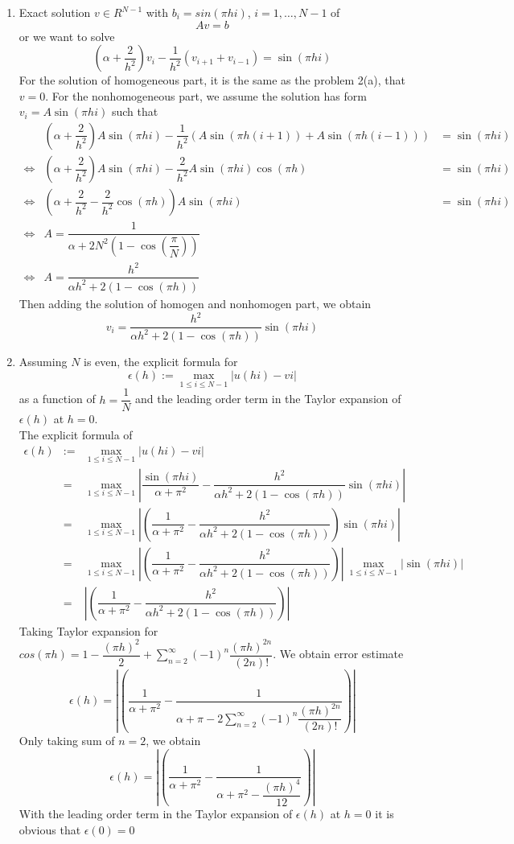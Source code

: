 \documentclass[a4paper,10pt]{article}
\begin{document}
\begin{enumerate}[label=(\alph*)]
		\item Exact solution $ v \in R^{N-1} $ with $ b_{i}=sin(\pi h i) $, $ i = 1 ,\dots, N-1 $ of
		\[ Av=b \]
		or we want to solve
		\[ (\alpha+\dfrac{2}{h^2})v_{i} -\dfrac{1}{h^2}(v_{i+1}+v_{i-1}) = \sin(\pi h i) \]
		For the solution of homogeneous part, it is the same as the problem 2(a), that $ v=0 $.
		For the nonhomogeneous part, we assume the solution has form $ v_{i} = A \sin(\pi h i) $ such that
		\begin{eqnarray}\nonumber
		&(\alpha+\dfrac{2}{h^2})A \sin(\pi h i) -\dfrac{1}{h^2}(A \sin(\pi h (i+1))+A \sin(\pi h (i-1))) &= \sin(\pi h i) \\ \nonumber
		\Leftrightarrow& (\alpha+\dfrac{2}{h^2})A \sin(\pi h i) -\dfrac{2}{h^2}A\sin(\pi h i)\cos(\pi h) &= \sin(\pi h i) \\ \nonumber
		\Leftrightarrow& (\alpha+\dfrac{2}{h^2}-\dfrac{2}{h^2}\cos(\pi h))A \sin(\pi h i)&= \sin(\pi h i) \\ \nonumber
		\Leftrightarrow& A = \dfrac{1}{\alpha+2N^2(1-\cos(\dfrac{\pi}{N}))}\\ \nonumber
		\Leftrightarrow& A = \dfrac{h^2}{\alpha h^2 + 2(1-\cos(\pi h))}
		\end{eqnarray}
		Then adding the solution of homogen and nonhomogen part, we obtain
		\[ v_{i} = \dfrac{h^2}{\alpha h^2 + 2(1-\cos(\pi h))} \sin(\pi h i) \]
		\item  Assuming $ N $ is even, the explicit formula for
		\[ \epsilon(h) := \max\limits_{1\leq i \leq N-1} |u(hi)-vi| \]
		as a function of $ h=\dfrac{1}{N} $ and the leading order term in the Taylor expansion of $ \epsilon(h) $ at $ h=0 $.\\
		The explicit formula of
		\begin{eqnarray}\nonumber
		\epsilon(h) &:=& \max\limits_{1\leq i \leq N-1} |u(hi)-vi| \\ \nonumber
		&=& \max\limits_{1\leq i \leq N-1} |\dfrac{\sin(\pi hi)}{\alpha+\pi^2}-\dfrac{h^2}{\alpha h^2 + 2(1-\cos(\pi h))} \sin(\pi h i)| \\ \nonumber
		&=& \max\limits_{1\leq i \leq N-1} |(\dfrac{1}{\alpha+\pi^2}-\dfrac{h^2}{\alpha h^2 + 2(1-\cos(\pi h))})\sin(\pi h i)|\\ \nonumber
		&=& \max\limits_{1\leq i \leq N-1}|(\dfrac{1}{\alpha+\pi^2}-\dfrac{h^2}{\alpha h^2 + 2(1-\cos(\pi h))})| \ \max\limits_{1\leq i \leq N-1}|\sin(\pi h i)|\\ \nonumber
		&=& |(\dfrac{1}{\alpha+\pi^2}-\dfrac{h^2}{\alpha h^2 + 2(1-\cos(\pi h))})|
		\end{eqnarray}
		Taking Taylor expansion for $ cos(\pi h) = 1-\dfrac{(\pi h)^2}{2} + \sum_{n=2}^{\infty} (-1)^n \dfrac{(\pi h)^{2n}}{(2n)!} $. We obtain error estimate
		\[  \epsilon(h) = |(\dfrac{1}{\alpha+\pi^2}-\dfrac{1}{\alpha + \pi -2\sum_{n=2}^{\infty} (-1)^n \dfrac{(\pi h)^{2n}}{(2n)!}})|\]
		Only taking sum of $ n=2 $, we obtain
		\[  \epsilon(h) = |(\dfrac{1}{\alpha+\pi^2}-\dfrac{1}{\alpha + \pi^2 -\dfrac{(\pi h)^{4}}{12}})|\]
		With the leading order term in the Taylor expansion of $ \epsilon(h) $ at $ h=0 $ it is obvious that $ \epsilon(0)=0 $
	\end{enumerate}
\end{document}
